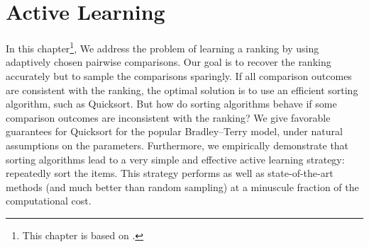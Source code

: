 \chapter{Active Learning}
\label{ch:robustsort}

In this chapter\footnote{%
This chapter is based on \citet{maystre2017just}.},
We address the problem of learning a ranking by using adaptively chosen pairwise comparisons.
Our goal is to recover the ranking accurately but to sample the comparisons sparingly.
If all comparison outcomes are consistent with the ranking, the optimal solution is to use an efficient sorting algorithm, such as Quicksort.
But how do sorting algorithms behave if some comparison outcomes are inconsistent with the ranking?
We give favorable guarantees for Quicksort for the popular Bradley--Terry model, under natural assumptions on the parameters.
Furthermore, we empirically demonstrate that sorting algorithms lead to a very simple and effective active learning strategy: repeatedly sort the items.
This strategy performs as well as state-of-the-art methods (and much better than random sampling) at a minuscule fraction of the computational cost.











